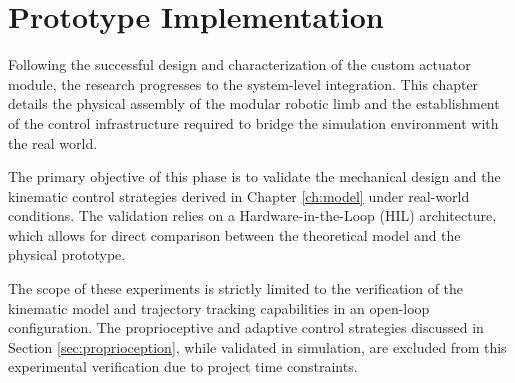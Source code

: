 \chapter{Prototype Implementation}
\label{ch:prototype}

Following the successful design and characterization of the custom actuator module, the research progresses
to the system-level integration. This chapter details the physical assembly of the modular robotic limb and
the establishment of the control infrastructure required to bridge the simulation environment with the real
world.

The primary objective of this phase is to validate the mechanical design and the kinematic control strategies
derived in Chapter \ref{ch:model} under real-world conditions. The validation relies on a
Hardware-in-the-Loop (HIL) architecture, which allows for direct comparison between the theoretical model
and the physical prototype.

The scope of these experiments is strictly limited to the verification of the kinematic model and trajectory tracking
capabilities in an open-loop configuration. The proprioceptive and adaptive control strategies discussed in Section
\ref{sec:proprioception}, while validated in simulation, are excluded from this experimental verification due to
project time constraints.



